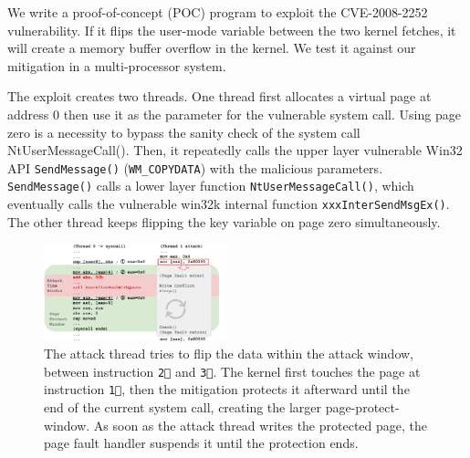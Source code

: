 We write a proof-of-concept (POC) program to exploit the CVE-2008-2252 vulnerability. If it flips the user-mode variable between the two kernel fetches, it will create a memory buffer overflow in the kernel. We test it against our mitigation in a multi-processor system.



The exploit creates two threads. One thread first allocates a virtual page at address 0 then use it as the parameter for the vulnerable system call. Using page zero is a necessity to bypass the sanity check of the system call NtUserMessageCall(). Then, it repeatedly calls the upper layer vulnerable Win32 API \texttt{SendMessage()} (\texttt{WM\_COPYDATA}) with the malicious parameters. \texttt{SendMessage()} calls a lower layer function \texttt{NtUserMessageCall()}, which eventually calls the vulnerable win32k internal function \texttt{xxxInterSendMsgEx()}. The other thread keeps flipping the key variable on page zero simultaneously.

\begin{figure}[th]
  \includegraphics[width=0.47\textwidth]{figures/ms08061case2}
  \centering
  \caption{The attack thread tries to flip the data within the attack window, between instruction \texttt{\textcircled{2}} and \texttt{\textcircled{3}}. The kernel first touches the page at instruction \texttt{\textcircled{1}}, then the mitigation protects it afterward until the end of the current system call, creating the larger page-protect-window. As soon as the attack thread writes the protected page, the page fault handler suspends it until the protection ends.}
  \label{fig:ms08061case}
\end{figure}


